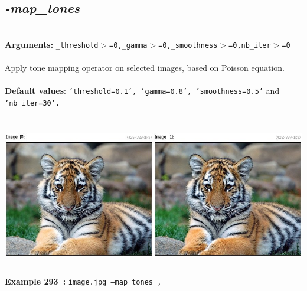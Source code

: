 \documentclass[a4paper,11pt,twoside]{book}
\begin{document}
\subsection{\emph{-map\_tones} }\vspace*{-0.5em}
~\\\textbf{Arguments: } 
{\small \texttt{\_threshold$>$=0,\_gamma$>$=0,\_smoothness$>$=0,nb\_iter$>$=0}}\\~\\
Apply tone mapping operator on selected images, based on Poisson equation.
~\\~\\\textbf{Default values}: {\small \texttt{'threshold=0.1', 'gamma=0.8', 'smoothness=0.5'} and \texttt{'nb\_iter=30'.}}
\begin{center}\includegraphics[keepaspectratio=true,height=7cm,width=\textwidth]{img/gmic_def293.jpg}\\
{\footnotesize \textbf{Example 293~:} \texttt{image.jpg --map\_tones ,}}
\end{center}
\end{document}
